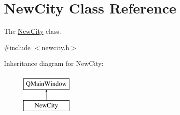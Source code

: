 \hypertarget{class_new_city}{}\section{New\+City Class Reference}
\label{class_new_city}


The \mbox{\hyperlink{class_new_city}{New\+City}} class.  




{\ttfamily \#include $<$newcity.\+h$>$}

Inheritance diagram for New\+City\+:\begin{figure}[H]
\begin{center}
\leavevmode
\includegraphics[height=2.000000cm]{class_new_city}
\end{center}
\end{figure}
